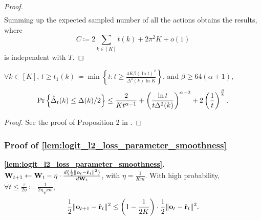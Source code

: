 \begin{proof}
\begin{equation*}
\begin{split}
	\end{split}
	\end{equation*}
Summing up the expected sampled number of all the actions obtains the results, where 
\begin{equation*}
C \coloneqq 2 \sum\limits_{k \in [K]}{ \bar{t}(k)} + 2 \pi^2 K + o(1)
\end{equation*}
is independent with $T$.
\end{proof}

\begin{lem}
	\label{lem:delta_estimation_lower_bound}
	$\forall k \in [K]$, $t \ge t_1(k) \coloneqq \min{\left\{ t : t \ge \frac{4 K \beta \left(\ln{t}\right)^2}{\Delta^4(k) \ln{K}} \right\}}$, and $\beta \ge 64 (\alpha +1)$,
	\begin{equation*}
	\operatorname*{Pr}\left\{ \hat{\Delta}_t(k) \le \Delta(k)/2 \right\} \le \frac{2}{ K t^{\alpha-1}} + \left( \frac{\ln{t}}{t \Delta^2(k)} \right)^{\alpha - 2} + 2 \left(\frac{1}{t}\right)^{\frac{\beta}{8}}.
	\end{equation*}
\end{lem}
\begin{proof}
    See the proof of Proposition 2 in \citet{seldin2017improved}.
\end{proof}

\subsubsection{Proof of \cref{lem:logit_l2_loss_parameter_smoothness}}

\textbf{\cref{lem:logit_l2_loss_parameter_smoothness}.}
${\mathbf{W}}_{t+1} \gets {\mathbf{W}}_t - \eta \cdot \frac{d \{ \frac{1}{2} \| {\mathbf{o}}_t - \hat{{\mathbf{r}}}_t \|^2 \}}{d {\mathbf{W}}_t}$, with $\eta = \frac{1}{K m}$. With high probability, $\forall t \le \frac{\tau}{2 \eta} \coloneqq \frac{1}{2 \eta \sqrt{m}}$, 
		\begin{equation*}
		\begin{split}
		\frac{1}{2} \| {\mathbf{o}}_{t+1} - \hat{{\mathbf{r}}}_t \|^2 \le \left( 1 - \frac{1}{2 K} \right) \cdot \frac{1}{2} \| {\mathbf{o}}_t - \hat{{\mathbf{r}}}_t \|^2.
		\end{split}
		\end{equation*}

